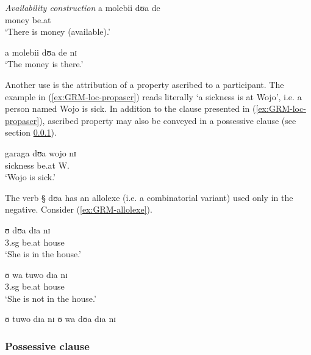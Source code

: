 \begin{exe}
\ex\label{ex:GRM-avail-vs-loc}
\begin{xlist}
\ex\label{ex:GRM-avail-cl}{\it Availability construction}
\gll a molebii dʊa de\\
{\art}  money be.at {\advl} \\
\glt  `There is money (available).'

\ex\label{ex:GRM-no-avail-cl}
 a molebii dʊa de nɪ\\
`The money is there.'
\end{xlist}
\end{exe}


Another use is the attribution of a property ascribed to a participant. The
example in (\ref{ex:GRM-loc-propascr}) reads literally `a sickness is at Wojo', 
i.e. a person named Wojo is sick.  In addition to the clause presented in
(\ref{ex:GRM-loc-propascr}), ascribed property may also be conveyed in a
possessive clause (see section \ref{sec:GRM-poss-cl}). 


\begin{exe}
\ex\label{ex:GRM-loc-propascr}
\gll garaga dʊa wojo nɪ\\
sickness be.at W. {\postp}\\
\glt  `Wojo is sick.'
\end{exe}

 The
verb {\S
dʊa} has an allolexe (i.e. a combinatorial variant) used only in the negative.
Consider (\ref{ex:GRM-allolexe}).

\begin{exe}
\ex\label{ex:GRM-allolexe}
\begin{xlist}
\ex\label{ex:GRM-allolexe-pos}
\gll ʊ  dʊa dɪa nɪ \\
{\sc 3.sg} be.at house {\postp}\\
\glt  `She is in the house.'

\ex\label{ex:GRM-allolexe-neg}
\gll ʊ  wa tuwo dɪa nɪ \\
{\sc 3.sg} {\neg} be.at  house {\postp}\\
\glt  `She is not in the house.'


\ex\label{ex:GRM-allolexe-pos-out}
 \textasteriskcentered ʊ  tuwo dɪa nɪ
\ex\label{ex:GRM-allolexe-neg-out}
 \textasteriskcentered ʊ  wa dʊa dɪa nɪ
\end{xlist}

\end{exe}




\subsubsection{Possessive clause}
\label{sec:GRM-poss-cl}

